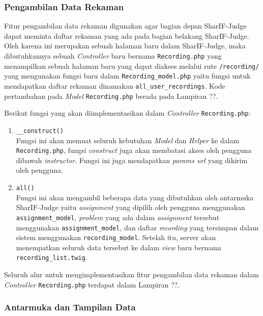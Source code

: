 \subsubsection{Pengambilan Data Rekaman}

Fitur pengambilan data rekaman digunakan agar bagian depan SharIF-Judge dapat meminta daftar rekaman yang ada pada bagian belakang SharIF-Judge. Oleh karena ini merupakan sebuah halaman baru dalam SharIF-Judge, maka dibutuhkannya sebuah \textit{Controller} baru bernama \verb|Recording.php| yang menampilkan sebuah halaman baru yang dapat diakses melalui rute \verb|/recording/| yang mengunakan fungsi baru dalam \verb|Recording_model.php| yaitu fungsi untuk mendapatkan daftar rekaman dinamakan \verb|all_user_recordings|. Kode pertambahan pada \textit{Model} \verb|Recording.php| berada pada Lampiran ??.

Berikut fungsi yang akan diimplementasikan dalam \textit{Controller} \verb|Recording.php|:
\begin{enumerate}
    \item \verb|__construct()| \\
    Fungsi ini akan memuat seluruh kebutuhan \textit{Model} dan \textit{Helper} ke dalam \verb|Recording.php|, fungsi \textit{construct} juga akan membatasi akses oleh pengguna dibawah \textit{instructor}. Fungsi ini juga mendapatkan \textit{params url} yang dikirim oleh pengguna. 

    \item \verb|all()| \\
    Fungsi ini akan mengambil beberapa data yang dibutuhkan oleh antarmuka SharIF-Judge yaitu \textit{assignment} yang dipilih oleh pengguna menggunakan \verb|assignment_model|, \textit{problem} yang ada dalam \textit{assignment} tersebut menggunakan \verb|assignment_model|, dan daftar \textit{recording} yang tersimpan dalam sistem menggunakan \verb|recording_model|. Setelah itu, server akan menempatkan seluruh data tersebut ke dalam \textit{view} baru bernama \verb|recording_list.twig|.
\end{enumerate}

Seluruh alur untuk mengimplementasikan fitur pengambilan data rekaman dalam \textit{Controller} \verb|Recording.php| terdapat dalam Lampiran ??.

\subsubsection{Antarmuka dan Tampilan Data}

